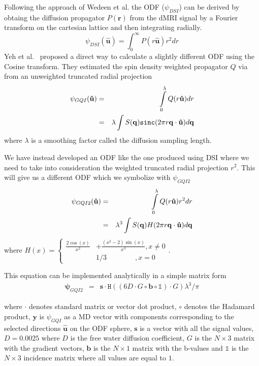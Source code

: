 \documentclass[9pt,conference,a4paper]{IEEEtran}
\begin{document}
Following the approach of Wedeen et al.
\cite{WWS+08} 
the ODF ($\psi_{DSI}$) can be derived by obtaing the diffusion propagator $P(\mathbf{r})$ from the dMRI signal
by a Fourier transform on the cartesian lattice and then integrating radially. 
\begin{equation}
\psi_{DSI}(\hat{\mathbf{u}})=\int_{0}^{\infty}P(r\hat{\mathbf{u}})r^{2}dr\label{eq:ODF_DSI}
\end{equation}
Yeh
et al.~\cite{Yeh2010} proposed a direct way to calculate a slightly
different ODF using the Cosine transform. 
They estimated the spin density weighted propagator $Q$ via
from an unweighted truncated radial projection
\begin{eqnarray}
\psi_{GQI}(\mathbf{\hat{u}}) & = & \intop_{0}^{\lambda}Q(r\mathbf{\hat{u}})dr\label{eq:SDF}\nonumber\\
 & = & \lambda\int S(\mathbf{q})\mathtt{sinc}(2\pi r\mathbf{q}\cdot\mathbf{\hat{u}})d\mathbf{q}
\end{eqnarray}
where $\lambda$ is a smoothing factor called the diffusion sampling length.

We have instead developed an ODF like the one produced using
DSI where we need to take into consideration the weighted truncated
radial projection $r^2$. This will give us a different ODF which we symbolize
with $\psi_{GQI2}$\begin{eqnarray}
\psi_{GQI2}(\mathbf{\hat{u}}) & = & \intop_{0}^{\lambda}Q(r\mathbf{\hat{u}})r^{2}dr\nonumber\label{eq:SDF2}\\
 & = & \lambda^{3}\int S(\mathbf{q})H(2\pi r\mathbf{q}\cdot\mathbf{\hat{u}})d\mathbf{q}\end{eqnarray}
\noindent where $H(x)=\begin{cases}
\frac{2\cos(x)}{x^{2}} & +\frac{(x^{2}-2)\sin(x)}{x^{3}},x\neq0\\
 & 1/3\qquad\qquad,x=0\end{cases}$.
\begin{flushleft}
This equation can be implemented analytically in a simple matrix form
\begin{eqnarray}
\bm{\psi}_{GQI2} & = & \mathbf{s}\cdot\mathtt{H}((6D\cdot G\circ\mathbf{b}\circ\mathbb{1})\cdot G)\lambda^{3}/\pi\label{eq:GQI2}
\end{eqnarray}

\par\end{flushleft}

\begin{flushleft}
where $\cdot$ denotes standard matrix or vector dot product, $\circ$
denotes the Hadamard product, $\mathbf{y}$ is $\psi_{GQI}$ as a
MD vector with components corresponding to the selected
directions $\hat{\mathbf{u}}$ on the ODF sphere, $\mathbf{s}$ is
a vector with all the signal values, $D=0.0025$
where $D$ is the free water diffusion coefficient,
$G$ is the $N\times3$ matrix with the gradient vectors, $\mathbf{b}$
is the $N\times1$ matrix with the b-values and $\mathbb{1}$ is the
$N\times3$ incidence matrix where all values are equal to $1$.
\par\end{flushleft}
\end{document}
